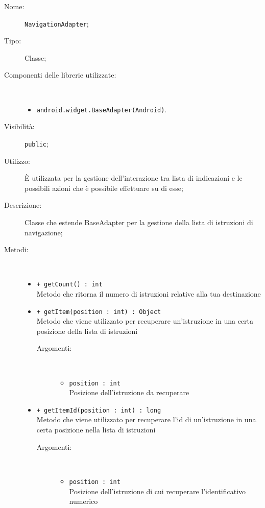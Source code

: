 \documentclass[../DefinizioneDiProdotto.tex]{subfiles}
\begin{document}
    \begin{description}
\item[Nome:] \texttt{NavigationAdapter};
\item[Tipo:] Classe;
\item[Componenti delle librerie utilizzate:] \
\begin{itemize}
\item \texttt{android.widget.BaseAdapter(Android)}.

\end{itemize}
\item[Visibilità:] \texttt{public};
\item[Utilizzo:] È utilizzata per la gestione dell'interazione tra lista di indicazioni e le possibili azioni che è possibile effettuare su di esse;
\item[Descrizione:] Classe che estende BaseAdapter per la gestione della lista di istruzioni di navigazione;
\item[Metodi:] \
\begin{itemize}
\item \texttt{+ getCount() : int}\\
Metodo che ritorna il numero di istruzioni relative alla tua destinazione
 \item \texttt{+ getItem(position : int) : Object}\\
Metodo che viene utilizzato per recuperare un'istruzione in una certa posizione della lista di istruzioni
 \begin{description}
\item[Argomenti:] \
\begin{itemize}
\item \texttt{position : int}\\
Posizione dell'istruzione da recuperare\end{itemize}
\end{description}
\item \texttt{+ getItemId(position : int) : long}\\
Metodo che viene utilizzato per recuperare l'id di un'istruzione in una certa posizione nella lista di istruzioni
 \begin{description}
\item[Argomenti:] \
\begin{itemize}
\item \texttt{position : int}\\
Posizione dell'istruzione di cui recuperare l'identificativo numerico\end{itemize}
\end{description}

\end{itemize}
\end{description}
\end{document}
